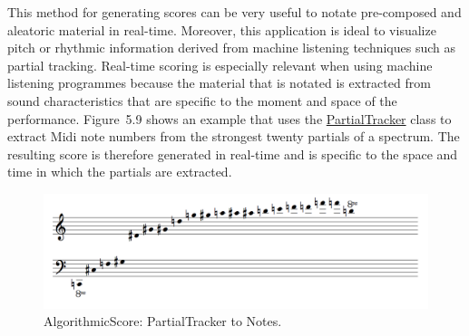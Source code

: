 This method for generating scores can be very useful to notate pre-composed and aleatoric material in real-time. Moreover, this application is ideal to visualize pitch or rhythmic information derived from machine listening techniques such as partial tracking. Real-time scoring is especially relevant when using machine listening programmes because the material that is notated is extracted from sound characteristics that are specific to the moment and space of the performance. \mbox{Figure 5.9} shows an example that uses the \hyperlink{partrack}{PartialTracker} class to extract Midi note numbers from the strongest twenty partials of a spectrum. The resulting score is therefore generated in real-time and is specific to the space and time in which the partials are extracted.
\begin{figure}[htbp] %
   \centering
   \includegraphics[width=17cm]{chapter5/algoScore_partials.tif} %
   \caption{AlgorithmicScore: PartialTracker to Notes.}
   \label{fig:example}
\end{figure}\

